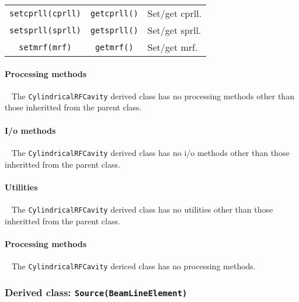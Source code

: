 \begin{table}[h]
\begin{center}
\begin{tabular}{|c|c|p{5cm}|}
      \texttt{setcprll(cprll)}              & \texttt{getcprll()}             & Set/get cprll.                     \\
      \texttt{setsprll(sprll)}              & \texttt{getsprll()}             & Set/get sprll.                     \\
      \texttt{setmrf(mrf)}                  & \texttt{getmrf()}              & Set/get mrf.                     \\
      \hline
    \end{tabular}
  \end{center}
\end{table}

\paragraph{Processing methods} ~\newline
\noindent
The \texttt{CylindricalRFCavity} derived class has no processing
methods other than those inheritted from the parent class.

\paragraph{I/o methods} ~\newline
\noindent
The \texttt{CylindricalRFCavity} derived class has no i/o methods other
than those inheritted from the parent class.

\paragraph{Utilities} ~\newline
\noindent
The \texttt{CylindricalRFCavity} derived class has no utilities other
than those inheritted from the parent class. 

\paragraph{Processing methods} ~\newline
\noindent
The \texttt{CylindricalRFCavity} dericed class has no processing methods.

\FloatBarrier

\subsubsection{Derived class: \texttt{Source(BeamLineElement)}}

